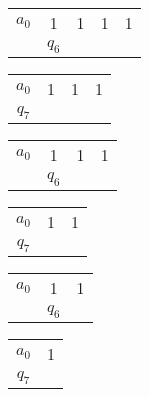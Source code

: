 \documentclass[14pt, a4paper]{article}
\begin{document}
    \begin{center}
        \begin{tabular}{ | c c c c c | }
            \hline
            $a_0$ & 1 & 1 & 1 & 1 \\
            & $q_6$ & & &  \\
            \hline
        \end{tabular}
    \end{center}
    
    \begin{center}
        \begin{tabular}{ | c c c c | }
            \hline
            $a_0$ & 1 & 1 & 1 \\
            $q_7$ & & & \\
            \hline
        \end{tabular}
    \end{center}
    
    \begin{center}
        \begin{tabular}{ | c c c c | }
            \hline
            $a_0$ & 1 & 1 & 1 \\
            & $q_6$ & &   \\
            \hline
        \end{tabular}
    \end{center}
    
    \begin{center}
        \begin{tabular}{ | c c c | }
            \hline
            $a_0$ & 1 & 1 \\
            $q_7$ & & \\
            \hline
        \end{tabular}
    \end{center}
    
    \begin{center}
        \begin{tabular}{ | c c c | }
            \hline
            $a_0$ & 1 & 1 \\
            & $q_6$ & \\
            \hline
        \end{tabular}
    \end{center}
    
    \begin{center}
        \begin{tabular}{ | c c | }
            \hline
            $a_0$ & 1 \\
            $q_7$ & \\
            \hline
        \end{tabular}
    \end{center}
    
\end{document}
